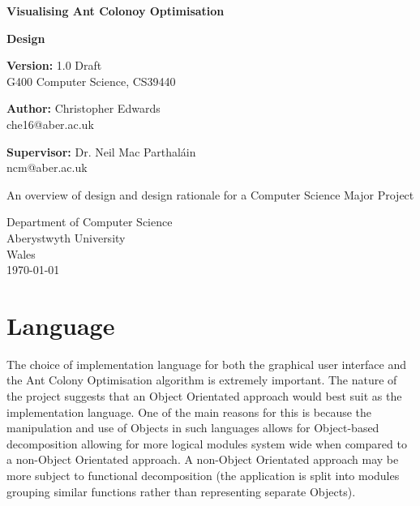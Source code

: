 \documentclass[10pt,a4paper]{article}
\begin{document}
\begin{titlepage}
    \begin{center}
        \vspace{1cm}
        
        \Huge
        \textbf{Visualising Ant Colonoy Optimisation}
        
	 \vspace{0.5cm}
       
        \huge
        \textbf{Design} \\
        
        \vspace{1.0cm}
        
        \Large
	 \textbf{Version:} 1.0 Draft \\
        G400  Computer Science, CS39440
	  

        \vspace{1.0cm}
        
	  \Large
        \textbf{Author:} Christopher Edwards \\
         che16@aber.ac.uk

 	  \vspace{0.8cm}
 	  \textbf{Supervisor:} Dr. Neil Mac Parthaláin \\
         ncm@aber.ac.uk
        
        \vspace{3.0cm}
        
        An overview of design and design rationale for a Computer Science Major Project
                
        \vspace{0.8cm}
                
        \Large
        Department of Computer Science\\
        Aberystwyth University\\
        Wales\\
        \today
        
	\end{center}
\end{titlepage}

\section{Language}

The choice of implementation language for both the graphical user interface and the Ant Colony Optimisation algorithm is extremely important. The nature of the project suggests that an Object Orientated approach would best suit as the implementation language. One of the main reasons for this is because the manipulation and use of Objects in such languages allows for Object-based decomposition allowing for more logical modules system wide when compared to a non-Object Orientated approach. A non-Object Orientated approach may be more subject to functional decomposition (the application is split into modules grouping similar functions rather than representing separate Objects).
\end{document}
